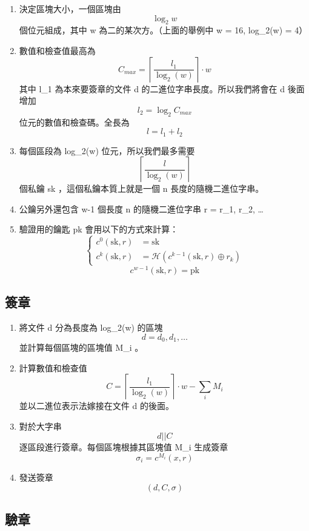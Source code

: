 \documentclass[
]{article}
\providecommand{\tightlist}{%
  \setlength{\itemsep}{0pt}\setlength{\parskip}{0pt}}
\begin{document}
\begin{enumerate}
\def\labelenumi{\arabic{enumi}.}
\item
  決定區塊大小，一個區塊由 \[
  \log_{2}w 
  \] 個位元組成，其中 w 為二的某次方。（上面的舉例中 w = 16, log\_2(w) =
  4）
\item
  數值和檢查值最高為 \[
  C_{max} = \left\lceil  \frac{l_{1}}{\log_{2}(w)}  \right\rceil\cdot w
  \] 其中 l\_1 為本來要簽章的文件 d 的二進位字串長度。所以我們將會在 d
  後面增加 \[
  l_{2} = \log_{2}C_{max}
  \] 位元的數值和檢查碼。全長為 \[
  l = l_{1}+l_{2}
  \]
\item
  每個區段為 log\_2(w) 位元，所以我們最多需要 \[
  \left\lceil  \frac{l}{\log_{2}(w)}  \right\rceil 
  \] 個私鑰 sk ，這個私鑰本質上就是一個 n 長度的隨機二進位字串。
\item
  公鑰另外還包含 w-1 個長度 n 的隨機二進位字串 r = r\_1, r\_2, \ldots{}
\item
  驗證用的鑰匙 pk 會用以下的方式來計算： \[
  \left\{\begin{aligned}
  c^{0}(\mathrm{sk}, r) &= \mathrm{sk}\\
  c^{k}(\mathrm{sk}, r) &= \mathcal{H}(c^{k-1}(\mathrm{sk},r) \oplus r_{k})
  \end{aligned}\right.
  \] \[
  c^{w-1}(\mathrm{sk},r) = \mathrm{pk}
  \]
\end{enumerate}

\hypertarget{ux7c3dux7ae0}{%
\subsection{簽章}\label{ux7c3dux7ae0}}

\begin{enumerate}
\def\labelenumi{\arabic{enumi}.}
\tightlist
\item
  將文件 d 分為長度為 log\_2(w) 的區塊 \[
  d = d_{0},d_{1},\dots
  \] 並計算每個區塊的區塊值 M\_i 。
\item
  計算數值和檢查值 \[
  C = \left\lceil \frac{l_{1}}{\log_{2}(w)} \right  \rceil  \cdot w - \sum_{i} M_{i}
  \] 並以二進位表示法嫁接在文件 d 的後面。
\item
  對於大字串 \[
  d || C
  \] 逐區段進行簽章。每個區塊根據其區塊值 M\_i 生成簽章 \[
  \sigma_{i} = c^{M_{i}}(x,r)
  \]
\item
  發送簽章 \[
  (d, C, \sigma)
  \]
\end{enumerate}

\hypertarget{ux9a57ux7ae0}{%
\subsection{驗章}\label{ux9a57ux7ae0}}
\end{document}
